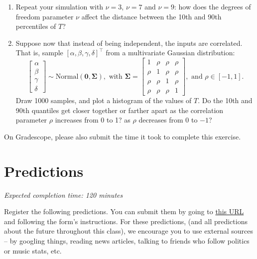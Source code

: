\documentclass[11pt]{article}
\begin{document}
\begin{enumerate}
	\item Repeat your simulation with $\nu = 3$, $\nu = 7$ and $\nu = 9$: how does the degrees of freedom parameter $\nu$ affect the distance between the 10th and 90th percentiles of $T$?
	\item Suppose now that instead of being independent, the inputs are correlated. That is, sample $[\alpha, \beta, \gamma, \delta]^\top$ from a multivariate Gaussian distribution: 
		$$
		\begin{bmatrix}
			\alpha\\
			\beta\\
			\gamma\\
			\delta	
		\end{bmatrix} \sim \text{Normal}(\mathbf{0}, \mathbf{\Sigma}),
		\text{ with }
		\mathbf{\Sigma} = \begin{bmatrix}
				1 & \rho & \rho & \rho\\
				\rho & 1 & \rho & \rho\\
				\rho & \rho & 1 & \rho\\
				\rho & \rho & \rho & 1
			\end{bmatrix},
		\text{ and } \rho \in [-1, 1].
		$$
	Draw 1000 samples, and plot a histogram of the values of $T$. Do the 10th and 90th quantiles get closer together or farther apart as the correlation parameter $\rho$ increases from 0 to 1? as $\rho$ decreases from 0 to $-1$?
\end{enumerate}


On Gradescope, please also submit the time it took to complete this exercise.

\section*{Predictions}

\emph{Expected completion time: 120 minutes} 

Register the following predictions. You can submit them by going to \href{https://docs.google.com/forms/d/1zfza4lPpQWRJDRBghY6a9-HK3erBo32wJBQy-BGfhBA/edit}{this URL} and following the form's instructions. For these predictions, (and all predictions about the future throughout this class), we encourage you to use external sources -- by googling things, reading news articles, talking to friends who follow politics or music stats, etc.
\end{document}
